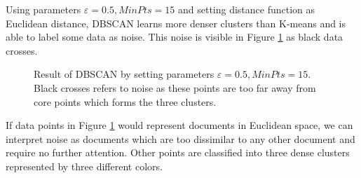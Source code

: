 Using parameters $\varepsilon = 0.5, MinPts = 15$ and setting distance function as Euclidean distance, DBSCAN learns more denser clusters than K-means and is able to label some data as noise. This noise is visible in Figure \ref{fig-dbscan-example} as black data crosses. 

\begin{figure}[ht]
\centering
\setlength\figureheight{7cm}
\setlength\figurewidth{7cm}

\caption{Result of DBSCAN by setting parameters $\varepsilon = 0.5, MinPts = 15$. Black crosses refers to noise as these points are too far away from core points which forms the three clusters.} \label{fig-dbscan-example}
\end{figure}

\newpage

\noindent
If data points in Figure \ref{fig-dbscan-example} would represent documents in Euclidean space, we can interpret noise as documents which are too dissimilar to any other document and require no further attention. Other points are classified into three dense clusters represented by three different colors. 